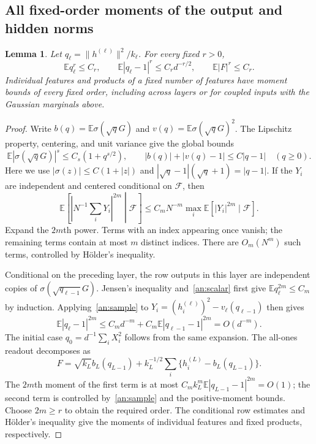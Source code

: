\documentclass[a4paper]{tufte-handout}
\newtheorem{lemma}{Lemma}
\newcommand{\E}{\mathbb E}
\begin{document}
\begin{fullwidth}
\subsection{All fixed-order moments of the output and hidden norms}
\begin{lemma}\label{an:moments}
Let $q_\ell=\|h^{(\ell)}\|^2/k_\ell$. For every fixed $r>0$,
\[
 \mathbb E q_\ell^r\le C_r,\qquad
 \mathbb E|q_\ell-1|^r\le C_r d^{-r/2},\qquad
 \mathbb E|F|^r\le C_r.
\]
Individual features and products of a fixed number of features have moment bounds of every fixed order, including across layers or for coupled inputs with the Gaussian marginals above.
\end{lemma}
\begin{proof}
Write $b(q)=\E\sigma(\sqrt qG)$ and $v(q)=\E\sigma(\sqrt qG)^2$.
The Lipschitz property, centering, and unit variance give the global bounds
\begin{equation}\label{an:scalar}
 \E|\sigma(\sqrt qG)|^s\le C_s(1+q^{s/2}),\qquad
 |b(q)|+|v(q)-1|\le C|q-1|\quad(q\ge0).
\end{equation}
Here we use $|\sigma(z)|\le C(1+|z|)$ and
$|\sqrt q-1|(\sqrt q+1)=|q-1|$.
If the $Y_i$ are independent and centered conditional on $\mathcal F$, then
\begin{equation}\label{an:sample}
 \E\left[\left|N^{-1}\sum_iY_i\right|^{2m}\middle|\mathcal F\right]
 \le C_mN^{-m}\max_i\E[|Y_i|^{2m}\mid\mathcal F].
\end{equation}
Expand the $2m$th power. Terms with an index appearing once vanish; the remaining terms contain at most $m$ distinct indices.
There are $O_m(N^m)$ such terms, controlled by H\"older's inequality.

Conditional on the preceding layer, the row outputs in this layer are independent copies of $\sigma(\sqrt{q_{\ell-1}}G)$.
Jensen's inequality and~\eqref{an:scalar} first give $\E q_\ell^{2m}\le C_m$ by induction.
Applying~\eqref{an:sample} to $Y_i=(h_i^{(\ell)})^2-v_\ell(q_{\ell-1})$ then gives
\[
 \E|q_\ell-1|^{2m}\le C_md^{-m}+C_m\E|q_{\ell-1}-1|^{2m}=O(d^{-m}).
\]
The initial case $q_0=d^{-1}\sum_iX_i^2$ follows from the same expansion.
The all-ones readout decomposes as
\[
 F=\sqrt{k_L}b_L(q_{L-1})+
 k_L^{-1/2}\sum_i\{h_i^{(L)}-b_L(q_{L-1})\}.
\]
The $2m$th moment of the first term is at most $C_mk_L^m\E|q_{L-1}-1|^{2m}=O(1)$;
the second term is controlled by~\eqref{an:sample} and the positive-moment bounds.
Choose $2m\ge r$ to obtain the required order. The conditional row estimates and H\"older's inequality give the moments of individual features and fixed products, respectively.
\end{proof}


\end{fullwidth}
\end{document}
